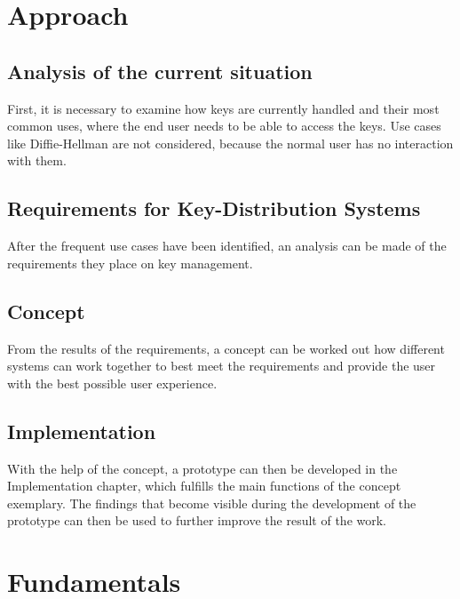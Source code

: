 \documentclass[12pt,oneside,a4paper,parskip]{scrbook}
\begin{document}

\chapter{Approach}

\section{Analysis of the current situation}

First, it is necessary to examine how keys are currently handled and their most common uses, where the end user needs to be able to access the keys. Use cases like Diffie-Hellman are not considered, because the normal user has no interaction with them.

\section{Requirements for Key-Distribution Systems}

After the frequent use cases have been identified, an analysis can be made of the requirements they place on key management. 

\section{Concept}

From the results of the requirements, a concept can be worked out how different systems can work together to best meet the requirements and provide the user with the best possible user experience. 

\section{Implementation}

With the help of the concept, a prototype can then be developed in the Implementation chapter, which fulfills the main functions of the concept exemplary. The findings that become visible during the development of the prototype can then be used to further improve the result of the work.

\chapter{Fundamentals}
\end{document}

